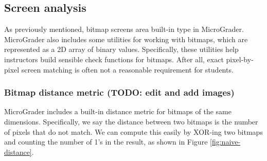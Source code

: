 \documentclass[12pt]{article}
\begin{document}
\subsection{Screen analysis}
As previously mentioned, bitmap screens area built-in type in MicroGrader.  MicroGrader also includes some utilities for working with bitmaps, which are represented as a 2D array of binary values.  Specifically, these utilities help instructors build sensible check functions for bitmaps.  After all, exact pixel-by-pixel screen matching is often not a reasonable requirement for students.

\subsubsection{Bitmap distance metric (TODO: edit and add images)}
MicroGrader includes a built-in distance metric for bitmaps of the same dimensions.  Specifically, we say the distance between two bitmaps is the number of pixels that do not match.  We can compute this easily by XOR-ing two bitmaps and counting the number of 1's in the result, as shown in Figure \ref{fig:naive-distance}.
\end{document}
